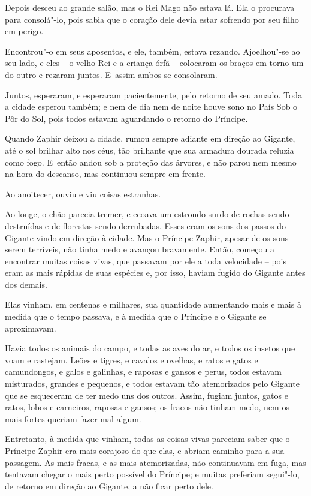 Depois desceu ao grande salão, mas o Rei Mago não estava lá. Ela o
procurava para consolá"-lo, pois sabia que o coração dele devia estar
sofrendo por seu filho em perigo.

Encontrou"-o em seus aposentos, e ele, também, estava rezando.
Ajoelhou"-se ao seu lado, e eles -- o velho Rei e a criança órfã --
colocaram os braços em torno um do outro e rezaram juntos. E~assim ambos
se consolaram.


Juntos, esperaram, e esperaram pacientemente, pelo retorno de seu amado.
Toda a cidade esperou também; e nem de dia nem de noite houve sono no
País Sob o Pôr do Sol, pois todos estavam aguardando o retorno do
Príncipe.

Quando Zaphir deixou a cidade, rumou sempre adiante em direção ao
Gigante, até o sol brilhar alto nos céus, tão brilhante que sua armadura
dourada reluzia como fogo. E~então andou sob a proteção das árvores, e
não parou nem mesmo na hora do descanso, mas continuou sempre em frente.

Ao anoitecer, ouviu e viu coisas estranhas.

Ao longe, o chão parecia tremer, e ecoava um estrondo surdo de rochas
sendo destruídas e de florestas sendo derrubadas. Esses eram os sons dos
passos do Gigante vindo em direção à cidade. Mas o Príncipe Zaphir,
apesar de os sons serem terríveis, não tinha medo e avançou bravamente.
Então, começou a encontrar muitas coisas vivas, que passavam por ele a
toda velocidade -- pois eram as mais rápidas de suas espécies e, por
isso, haviam fugido do Gigante antes dos demais.

Elas vinham, em centenas e milhares, sua quantidade aumentando mais e
mais à medida que o tempo passava, e à medida que o Príncipe e o Gigante
se aproximavam.

Havia todos os animais do campo, e todas as aves do ar, e todos os
insetos que voam e rastejam. Leões e tigres, e cavalos e ovelhas, e
ratos e gatos e camundongos, e galos e galinhas, e raposas e gansos e
perus, todos estavam misturados, grandes e pequenos, e todos estavam tão
atemorizados pelo Gigante que se esqueceram de ter medo uns dos outros.
Assim, fugiam juntos, gatos e ratos, lobos e carneiros, raposas e
gansos; os fracos não tinham medo, nem os mais fortes queriam fazer mal
algum.

Entretanto, à medida que vinham, todas as coisas vivas pareciam saber
que o Príncipe Zaphir era mais corajoso do que elas, e abriam caminho
para a sua passagem. As mais fracas, e as mais atemorizadas, não
continuavam em fuga, mas tentavam chegar o mais perto possível do
Príncipe; e muitas preferiam segui"-lo, de retorno em direção ao Gigante,
a não ficar perto dele.

